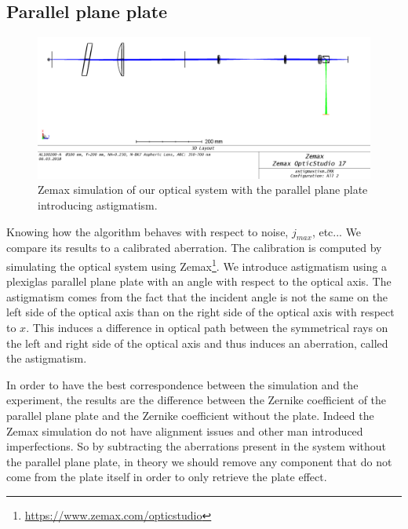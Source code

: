 \newpage
\subsection{Parallel plane plate}
\label{subsec:ParPlanePlate}

\begin{figure}
\begin{center}
\includegraphics[width=\textwidth,angle=0]{Figures/parallelPlanePlateWithBS.png}
\decoRule
\caption{Zemax simulation of our optical system with the parallel plane plate introducing astigmatism.}
\label{fig:parallelPlanePlate}
\end{center}
\end{figure}

Knowing how the algorithm behaves with respect to noise, $j_{max}$, etc... We compare its results to a calibrated aberration. The calibration is computed by simulating the optical system using Zemax\footnote{\url{https://www.zemax.com/opticstudio}}. We introduce astigmatism using a plexiglas parallel plane plate with an angle with respect to the optical axis. The astigmatism comes from the fact that the incident angle is not the same on the left side of the optical axis than on the right side of the optical axis with respect to $x$. This induces a difference in optical path between the symmetrical rays on the left and right side of the optical axis and thus induces an aberration, called the astigmatism.

In order to have the best correspondence between the simulation and the experiment, the results are the difference between the Zernike coefficient of the parallel plane plate and the Zernike coefficient without the plate. Indeed the Zemax simulation do not have alignment issues and other man introduced imperfections. So by subtracting the aberrations present in the system without the parallel plane plate, in theory we should remove any component that do not come from the plate itself in order to only retrieve the plate effect.

